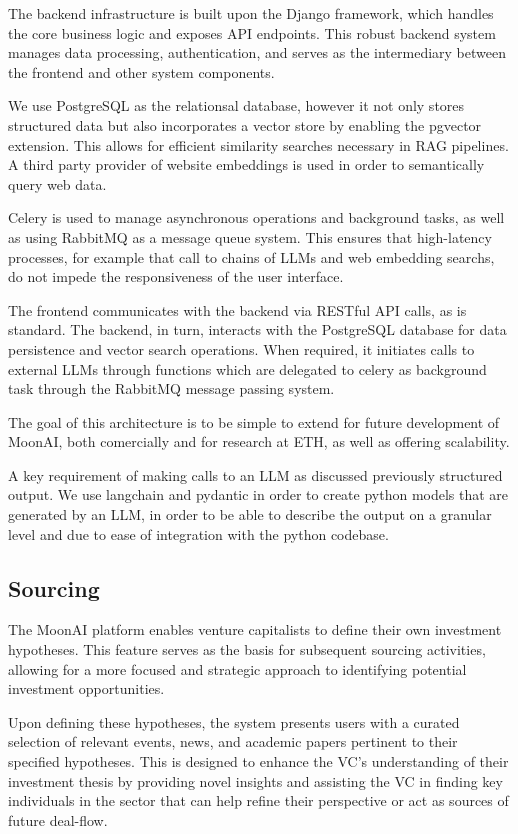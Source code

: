 \documentclass[a4paper, oneside]{discothesis}
\begin{document}
The backend infrastructure is built upon the Django framework, which handles the core business logic and exposes API endpoints. This robust backend system manages data processing, authentication, and serves as the intermediary between the frontend and other system components.

We use PostgreSQL as the relationsal database, however it not only stores structured data but also incorporates a vector store by enabling the pgvector extension. This allows for efficient similarity searches necessary in RAG pipelines. A third party provider of website embeddings is used in order to semantically query web data.

Celery is used to manage asynchronous operations and background tasks, as well as using RabbitMQ as a message queue system. This ensures that high-latency processes, for example that call to chains of LLMs and web embedding searchs, do not impede the responsiveness of the user interface.

The frontend communicates with the backend via RESTful API calls, as is standard. The backend, in turn, interacts with the PostgreSQL database for data persistence and vector search operations. When required, it initiates calls to external LLMs through functions which  are delegated to celery  as background task through the RabbitMQ message passing system.

The goal of this architecture is to be simple to extend for future development of MoonAI, both comercially and for research at ETH, as well as offering scalability.

A key requirement of making calls to an LLM as discussed previously structured output. We use langchain and pydantic in order to create python models that are generated by an LLM, in order to be able to describe the output on a granular level and due to ease of integration with the python codebase.  

\subsection{Sourcing}
The MoonAI platform enables venture capitalists to define their own investment hypotheses. 
This feature serves as the basis for subsequent sourcing activities, allowing for a more focused and strategic approach to identifying potential investment opportunities.

Upon defining these hypotheses, the system presents users with a curated selection of relevant events, news, and academic papers pertinent to their specified hypotheses. This is designed to enhance the VC's understanding of their investment thesis by providing novel insights and assisting the VC in finding key individuals in the sector that can help refine their perspective or act as sources of future deal-flow.
\end{document}
